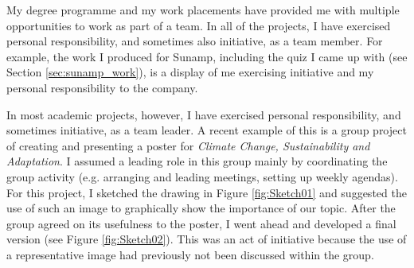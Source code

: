 My degree programme and my work placements have provided me with multiple opportunities to work as part of a team.
In all of the projects, I have exercised personal responsibility, and sometimes also initiative, as a team member.
For example, the work I produced for Sunamp, including the quiz I came up with (see Section \ref{sec:sunamp_work}), is a display of me exercising initiative and my personal responsibility to the company.

In most academic projects, however, I have exercised personal responsibility, and sometimes initiative, as a team leader.
A recent example of this is a group project of creating and presenting a poster for \textit{Climate Change, Sustainability and Adaptation}.
I assumed a leading role in this group mainly by coordinating the group activity (e.g. arranging and leading meetings, setting up weekly agendas).
For this project, I sketched the drawing in Figure \ref{fig:Sketch01} and suggested the use of such an image to graphically show the importance of our topic.
After the group agreed on its usefulness to the poster, I went ahead and developed a final version (see Figure \ref{fig:Sketch02}).
This was an act of initiative because the use of a representative image had previously not been discussed within the group.


